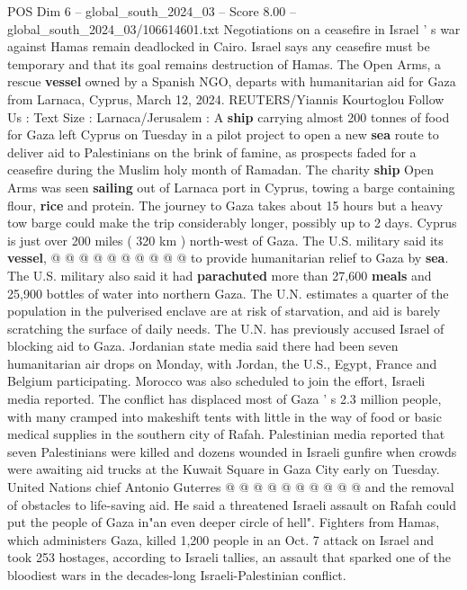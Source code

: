 \begin{textsample}{POS Dim 6 – global\_south\_2024\_03 – Score 8.00 – global\_south\_2024\_03/106614601.txt}  \label{ex:f6_pos_069}
Negotiations on a ceasefire in Israel ' s war against Hamas remain deadlocked in Cairo.
Israel says any ceasefire must be temporary and that its goal remains destruction of Hamas.
The Open Arms, a rescue \textbf{vessel} owned by a Spanish NGO, departs with humanitarian aid for Gaza from Larnaca, Cyprus, March 12, 2024.
REUTERS/Yiannis Kourtoglou Follow Us : Text Size : Larnaca/Jerusalem : A \textbf{ship} carrying almost 200 tonnes of food for Gaza left Cyprus on Tuesday in a pilot project to open a new \textbf{sea} route to deliver aid to Palestinians on the brink of famine, as prospects faded for a ceasefire during the Muslim holy month of Ramadan.
The charity \textbf{ship} Open Arms was seen \textbf{sailing} out of Larnaca port in Cyprus, towing a barge containing flour, \textbf{rice} and protein.
The journey to Gaza takes about 15 hours but a heavy tow barge could make the trip considerably longer, possibly up to 2 days.
Cyprus is just over 200 miles ( 320 km ) north-west of Gaza.
The U.S. military said its \textbf{vessel}, @ @ @ @ @ @ @ @ @ @ to provide humanitarian relief to Gaza by \textbf{sea}.
The U.S. military also said it had \textbf{parachuted} more than 27,600 \textbf{meals} and 25,900 bottles of water into northern Gaza.
The U.N. estimates a quarter of the population in the pulverised enclave are at risk of starvation, and aid is barely scratching the surface of daily needs.
The U.N. has previously accused Israel of blocking aid to Gaza.
Jordanian state media said there had been seven humanitarian air drops on Monday, with Jordan, the U.S., Egypt, France and Belgium participating.
Morocco was also scheduled to join the effort, Israeli media reported.
The conflict has displaced most of Gaza ' s 2.3 million people, with many cramped into makeshift tents with little in the way of food or basic medical supplies in the southern city of Rafah.
Palestinian media reported that seven Palestinians were killed and dozens wounded in Israeli gunfire when crowds were awaiting aid trucks at the Kuwait Square in Gaza City early on Tuesday.
United Nations chief Antonio Guterres @ @ @ @ @ @ @ @ @ @ and the removal of obstacles to life-saving aid.
He said a threatened Israeli assault on Rafah could put the people of Gaza in"an even deeper circle of hell".
Fighters from Hamas, which administers Gaza, killed 1,200 people in an Oct. 7 attack on Israel and took 253 hostages, according to Israeli tallies, an assault that sparked one of the bloodiest wars in the decades-long Israeli-Palestinian conflict.

\end{textsample}
